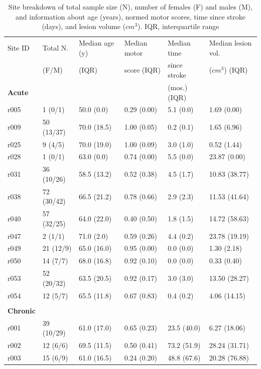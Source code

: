 \documentclass[10pt]{article}
\begin{document}
\newpage
\begin{table}[h]
\centering
\caption{Site breakdown of total sample size (N), number of females (F) and males (M), and information about age (years), normed motor scores, time since stroke (days), and lesion volume ($cm^3$). IQR, interquartile range}

\label{table:Demographics}
\begin{tabular}{llllll}
\toprule
Site ID & Total N. & Median age (y) & Median motor  & Median time    & Median lesion vol. \\
& (F/M) & (IQR) & score (IQR) &  since stroke  & ($cm^3$) (IQR) \\
 \textbf{Acute}  & & & & (mos.) (IQR) & \\
\arrayrulecolor{black!30}\midrule
r005 & 1 (0/1) & 50.0 (0.0) & 0.29 (0.00) & 5.1 (0.0) & 1.69 (0.00) \\
r009 & 50 (13/37) & 70.0 (18.5) & 1.00 (0.05) & 0.2 (0.1) & 1.65 (6.96) \\
r025 & 9 (4/5) & 70.0 (19.0) & 1.00 (0.09) & 3.0 (1.0) & 0.52 (1.44) \\
r028 & 1 (0/1) & 63.0 (0.0) & 0.74 (0.00) & 5.5 (0.0) & 23.87 (0.00) \\
r031 & 36 (10/26) & 58.5 (13.2) & 0.52 (0.38) & 4.5 (1.7) & 10.83 (38.77) \\
r038 & 72 (30/42) & 66.5 (21.2) & 0.78 (0.66) & 2.9 (2.3) & 11.53 (41.64) \\
r040 & 57 (32/25) & 64.0 (22.0) & 0.40 (0.50) & 1.8 (1.5) & 14.72 (58.63) \\
r047 & 2 (1/1) & 71.0 (2.0) & 0.59 (0.26) & 4.4 (0.2) & 23.78 (19.19) \\
r049 & 21 (12/9) & 65.0 (16.0) & 0.95 (0.00) & 0.0 (0.0) & 1.30 (2.18) \\
r050 & 14 (7/7) & 68.0 (16.8) & 0.92 (0.10) & 0.0 (0.0) & 0.33 (0.40) \\
r053 & 52 (20/32) & 63.5 (20.5) & 0.92 (0.17) & 3.0 (3.0) & 13.50 (28.27) \\
r054 & 12 (5/7) & 65.5 (11.8) & 0.67 (0.83) & 0.4 (0.2) & 4.06 (14.15) \\
 & & & & &\\
\textbf{Chronic}  & & & & &\\
\arrayrulecolor{black!30}\midrule
r001 & 39 (10/29) & 61.0 (17.0) & 0.65 (0.23) & 23.5 (40.0) & 6.27 (18.06) \\
r002 & 12 (6/6) & 69.5 (11.5) & 0.50 (0.41) & 73.2 (51.9) & 28.24 (31.71) \\
r003 & 15 (6/9) & 61.0 (16.5) & 0.24 (0.20) & 48.8 (67.6) & 20.28 (76.88) \\

\end{tabular}
\end{table}
\end{document}
